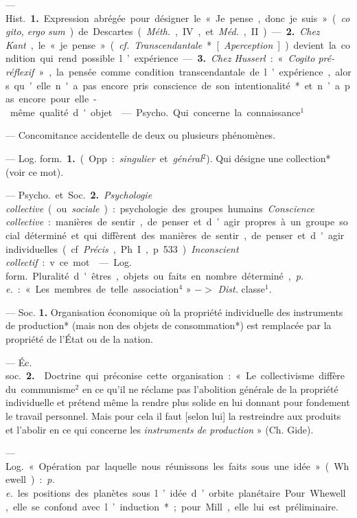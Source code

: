 \begin{itemize}[leftmargin=1cm, label=, itemsep=11pt]
 — \si{Hist.} {\bf 1.} Expression abrégée
pour désigner le « Je pense, donc je
suis » ({\it cogito, ergo sum}) de Descartes
({\it Méth.}, IV, et {\it Méd.}, II). — {\bf 2.} {\it Chez
Kant}, le « je pense » ({\it cf.} {\it Transcendantale}* [{\it Aperception}]) devient la
condition qui rend possible l’expérience. — {\bf 3.} {\it Chez Husserl} : « {\it Cogito
pré-réflexif} », la pensée comme condition transcendantale de l’expérience, alors qu’elle n'a pas encore
pris conscience de son intentionalité*
et n’a pas encore pour elle-même
qualité d'objet.

 — \si{Psycho.} Qui concerne la
connaissance$^1$

 — Concomitance accidentelle de deux ou plusieurs phénomènes.

 — \si{Log. form.} {\bf 1.} (Opp. : {\it singulier} et {\it général}$^2$). Qui désigne une
collection* (voir ce mot).

— \si{Psycho.} et \si{Soc.} {\bf 2.} {\it Psychologie
collective} (ou {\it sociale}) : psychologie
des groupes humains. {\it Conscience
collective} : manières de sentir, de
penser et d’agir propres à un groupe
social déterminé et qui diffèrent des
manières de sentir, de penser et
d'agir individuelles (cf. {\it Précis}, Ph. I,
p. 533). {\it Inconscient collectif} : v. ce
mot.

 — \si{Log. form.} Pluralité
d'êtres, objets ou faits en nombre
déterminé, {\it p. e.} : « Les membres de
telle association$^4$ » $->$ {\it Dist.} classe$^1$.

 — Soc.  {\bf 1.} Organisation économique où la propriété
individuelle des instruments de production* (mais non des objets de
consommation*) est remplacée par
la propriété de l’État ou de la nation.

— \si{Éc. soc.} {\bf 2.}  Doctrine qui préconise cette organisation : « Le collectivisme diffère du communisme$^2$
en ce qu'il ne réclame pas l'abolition
générale de la propriété individuelle
et prétend même la rendre plus
solide en lui donnant pour fondement le travail personnel. Mais pour
cela il faut [selon lui] la restreindre
aux produits et l’abolir en ce qui
concerne les {\it instruments de production} » (Ch. Gide).

 — \si{Log.} « Opération par
laquelle nous réunissons les faits
sous une idée » (Whewell) : {\it p. e.} les
positions des planètes sous l’idée
d’orbite planétaire. Pour Whewell,
elle se confond avec l’induction*;
pour Mill, elle lui est préliminaire.


\end{itemize}
